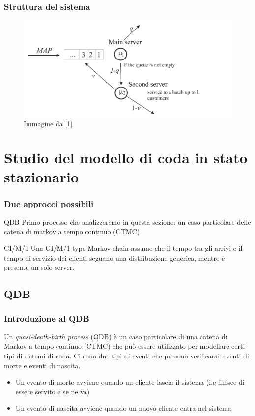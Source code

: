 \documentclass{beamer}
\begin{document}
\begin{frame}
    \frametitle{Struttura del sistema}
    \begin{figure}[h]
        \centering
        \includegraphics[width=\textwidth]{hVQg024.png}
        \caption{Immagine da [1]}
        \label{fig:diagramma_di_stato}
    \end{figure}
\end{frame}

\section{Studio del modello di coda in stato stazionario}

\begin{frame}
    \frametitle{Due approcci possibili}

    \begin{block}{QDB}
        Primo processo che analizzeremo in  questa sezione: un caso particolare delle catena di markov a tempo continuo (CTMC)
    \end{block}

    \begin{block}{GI/M/1}
        Una GI/M/1-type Markov chain assume che il tempo tra gli arrivi e il tempo di servizio dei clienti seguano una distribuzione generica, mentre è presente un solo server.
    \end{block}

\end{frame}

\subsection{QDB}


\begin{frame}
    \frametitle{Introduzione al QDB}
    \begin{block}{}
        Un \emph{quasi-death-birth process} (QDB) è un caso particolare di una catena di Markov a tempo continuo (CTMC) che può essere utilizzato per modellare certi tipi di sistemi di coda. Ci sono due tipi di eventi che possono verificarsi: eventi di morte e eventi di nascita.
    \end{block}
    \begin{itemize}
        \item Un evento di morte avviene quando un cliente lascia il sistema (i.e finisce di essere servito e se ne va)
        \item Un evento di nascita avviene quando un nuovo cliente entra nel sistema
    \end{itemize}
\end{frame}
\end{document}
